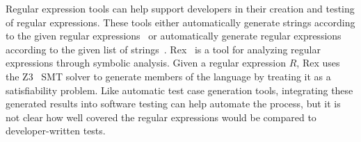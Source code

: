 Regular expression tools can help support developers in their creation and testing of regular expressions. These tools either automatically generate strings according to the given regular expressions~\cite{hampi, kiezun2009hampi, rex, brics} or automatically generate regular expressions according to the given list of strings~\cite{Babbar:2010:CBA:1871840.1871848, Li:2008:REL:1613715.1613719}. 
Rex~\cite{rex} is a tool for analyzing regular expressions through symbolic analysis.  
Given a regular expression $R$, Rex uses the Z3~\cite{de2008z3} SMT solver to generate members of the language by treating it as a satisfiability problem.  %
Like automatic test case generation tools, integrating these generated results into software testing can help automate the process, but it is not clear how well covered the regular expressions would be compared to developer-written tests.

